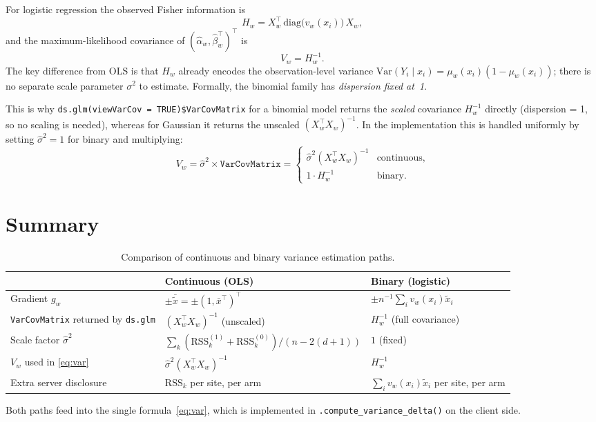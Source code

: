 \documentclass[11pt, a4paper]{article}
\newcommand{\Var}{\mathrm{Var}}
\newcommand{\xt}{\tilde{x}}
\newcommand{\hbeta}{\hat{\beta}}
\newcommand{\halpha}{\hat{\alpha}}
\newcommand{\hsigma}{\hat{\sigma}}
\begin{document}
For logistic regression the observed Fisher information is
\begin{equation}
  H_w = X_w^\top\,\mathrm{diag}\bigl(v_w(x_i)\bigr)\,X_w,
\end{equation}
and the maximum-likelihood covariance of $(\halpha_w,\hbeta_w^\top)^\top$ is
\begin{equation}\label{eq:V_bin}
  V_w = H_w^{-1}.
\end{equation}
The key difference from OLS is that $H_w$ already encodes the observation-level
variance $\Var(Y_i \mid x_i) = \mu_w(x_i)(1-\mu_w(x_i))$; there is no
separate scale parameter $\sigma^2$ to estimate.  Formally, the binomial family
has \emph{dispersion fixed at~1}.

This is why \texttt{ds.glm(viewVarCov = TRUE)\$VarCovMatrix} for a binomial
model returns the \emph{scaled} covariance $H_w^{-1}$ directly (dispersion = 1,
so no scaling is needed), whereas for Gaussian it returns the unscaled
$(X_w^\top X_w)^{-1}$.
In the implementation this is handled uniformly by setting
$\hsigma^2 = 1$ for binary and multiplying:
\begin{equation}
  V_w = \hsigma^2 \times \texttt{VarCovMatrix}
      = \begin{cases}
          \hsigma^2 (X_w^\top X_w)^{-1} & \text{continuous,}\\
          1 \cdot H_w^{-1}               & \text{binary.}
        \end{cases}
\end{equation}

\section{Summary}

\begin{table}[h]
\centering
\renewcommand{\arraystretch}{1.4}
\begin{tabular}{lll}
\toprule
                     & \textbf{Continuous (OLS)} & \textbf{Binary (logistic)} \\
\midrule
Gradient $g_w$       & $\pm\bar{\xt} = \pm(1,\bar{x}^\top)^\top$
                     & $\pm n^{-1}\sum_i v_w(x_i)\xt_i$ \\
\texttt{VarCovMatrix} returned by \texttt{ds.glm}
                     & $(X_w^\top X_w)^{-1}$ (unscaled)
                     & $H_w^{-1}$ (full covariance) \\
Scale factor $\hsigma^2$
                     & $\sum_k(\mathrm{RSS}_k^{(1)}+\mathrm{RSS}_k^{(0)})/(n-2(d{+}1))$
                     & $1$ (fixed) \\
$V_w$ used in \eqref{eq:var}
                     & $\hsigma^2(X_w^\top X_w)^{-1}$
                     & $H_w^{-1}$ \\
Extra server disclosure
                     & $\mathrm{RSS}_k$ per site, per arm
                     & $\sum_i v_w(x_i)\xt_i$ per site, per arm \\
\bottomrule
\end{tabular}
\caption{Comparison of continuous and binary variance estimation paths.}
\end{table}

Both paths feed into the single formula~\eqref{eq:var}, which is implemented in
\texttt{.compute\_variance\_delta()} on the client side.
\end{document}

